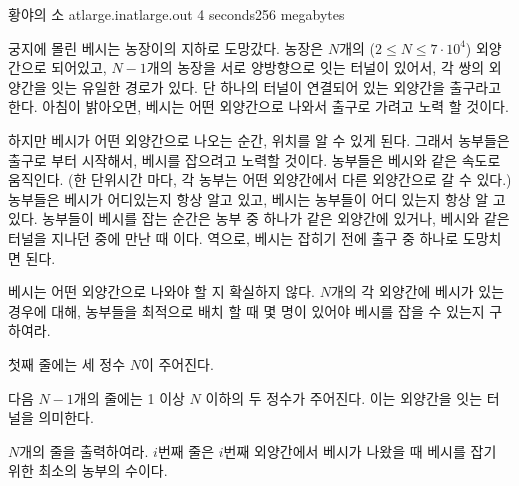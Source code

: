 \begin{problem}{황야의 소}
	{atlarge.in}{atlarge.out}
	{4 seconds}{256 megabytes}{}
	
	궁지에 몰린 베시는 농장이의 지하로 도망갔다. 농장은 $N$개의 ($2 \le N \le 7 \cdot 10^4$) 외양간으로 되어있고, $N-1$개의 농장을 서로 양방향으로 잇는 터널이 있어서, 각 쌍의 외양간을 잇는 유일한 경로가 있다. 단 하나의 터널이 연결되어 있는 외양간을 출구라고 한다. 아침이 밝아오면, 베시는 어떤 외양간으로 나와서 출구로 가려고 노력 할 것이다.
	
	하지만 베시가 어떤 외양간으로 나오는 순간, 위치를 알 수 있게 된다. 그래서 농부들은 출구로 부터 시작해서, 베시를 잡으려고 노력할 것이다. 농부들은 베시와 같은 속도로 움직인다. (한 단위시간 마다, 각 농부는 어떤 외양간에서 다른 외양간으로 갈 수 있다.) 농부들은 베시가 어디있는지 항상 알고 있고, 베시는 농부들이 어디 있는지 항상 알 고 있다. 농부들이 베시를 잡는 순간은 농부 중 하나가 같은 외양간에 있거나, 베시와 같은 터널을 지나던 중에 만난 때 이다. 역으로, 베시는 잡히기 전에 출구 중 하나로 도망치면 된다. 
	
	베시는 어떤 외양간으로 나와야 할 지 확실하지 않다. $N$개의 각 외양간에 베시가 있는 경우에 대해, 농부들을 최적으로 배치 할 때 몇 명이 있어야 베시를 잡을 수 있는지 구하여라.
	
	
	\InputFile
	
	첫째 줄에는 세 정수 $N$이 주어진다. 
	
	
	다음 $N-1$개의 줄에는 1 이상 $N$ 이하의 두 정수가 주어진다. 이는 외양간을 잇는 터널을 의미한다.
	
	
	\OutputFile
	
	$N$개의 줄을 출력하여라. $i$번째 줄은 $i$번째 외양간에서 베시가 나왔을 때 베시를 잡기 위한 최소의 농부의 수이다.
		
	
	\Constraints
		
	\begin{example}
	\end{example}
	
	
	
\end{problem}

